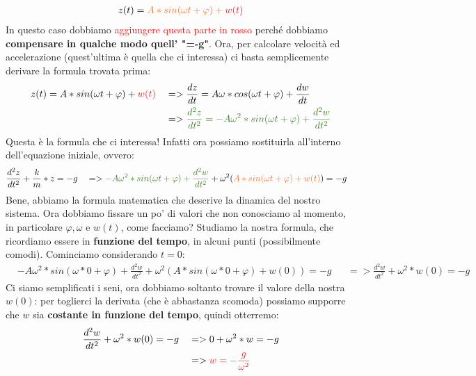             \begin{align*}
                z(t) = \textcolor{Orange}{A*sin(\omega t+\varphi)+\textcolor{Red}{w(t)}}
            \end{align*}
            In questo caso dobbiamo \textcolor{Red}{aggiungere questa parte in rosso} perché dobbiamo \textbf{compensare in qualche modo quell' "=-g"}. Ora, per calcolare velocità ed accelerazione (quest'ultima è quella che ci interessa) ci basta semplicemente derivare la formula trovata prima:
            \begin{align*}
                &z(t) = A*sin(\omega t+\varphi)+\textcolor{Red}{w(t)}&&=>\frac{dz}{dt}=A\omega*cos(\omega t+\varphi)+\frac{dw}{dt}\\
                & &&=>\textcolor{OliveGreen}{\frac{d^2z}{dt^2}=-A\omega^2*sin(\omega t+\varphi)+\frac{d^2w}{dt^2}}\\
            \end{align*}
            \textcolor{OliveGreen}{Questa} è la formula che ci interessa! Infatti ora possiamo sostituirla all'interno dell'equazione iniziale, ovvero:
            \begin{align*}
                &\frac{d^2z}{dt^2}+\frac{k}{m}*z=-g&&=> \textcolor{OliveGreen}{-A\omega^2*sin(\omega t+\varphi)+\frac{d^2w}{dt^2}} +\omega^2(\textcolor{Orange}{A*sin(\omega t+\varphi)+w(t)}) = -g
            \end{align*}
            Bene, abbiamo la formula matematica che descrive la dinamica del nostro sistema. Ora dobbiamo fissare un po' di valori che non conosciamo al momento, in particolare $\varphi, \omega$ e $ w(t)$, come facciamo? Studiamo la nostra formula, che ricordiamo essere in \textbf{funzione del tempo}, in alcuni punti (possibilmente comodi). Cominciamo considerando $t=0$:
            \begin{align*}
                &-A\omega^2*sin(\omega*0+\varphi)+\frac{d^2w}{dt^2} +\omega^2(A*sin(\omega *0+\varphi)+w(0)) = -g &&=> \frac{d^2w}{dt^2} +\omega^2*w(0) = -g
            \end{align*}
            Ci siamo semplificati i seni, ora dobbiamo soltanto trovare il valore della nostra $w(0)$: per toglierci la derivata (che è abbastanza scomoda) possiamo supporre che $w$ sia \textbf{costante in funzione del tempo}, quindi otterremo:
            \begin{align*}
                &\frac{d^2w}{dt^2} +\omega^2*w(0) = -g &&=> 0 + \omega^2*w=-g\\
                & &&=>\textcolor{Red}{w=-\frac{g}{\omega^2}}
            \end{align*}
